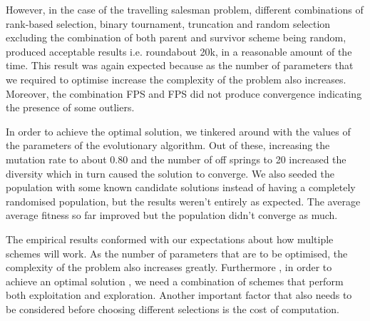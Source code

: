 \documentclass[a4paper]{article}
\begin{document}
However, in the case of the travelling salesman problem, different combinations of rank-based selection, binary tournament, truncation and random selection excluding the combination of both parent and survivor scheme being random, produced acceptable results i.e. roundabout 20k, in a reasonable amount of the time.
This result was again expected because as the number of parameters that we required to optimise increase the complexity of the problem also increases. Moreover, the combination FPS and FPS did not produce convergence indicating the presence of some outliers. \newline

In order to achieve the optimal solution, we tinkered around with the values of the parameters of the evolutionary algorithm. Out of these, increasing the mutation rate to about 0.80 and the number of off springs to 20  increased the diversity which in turn caused the solution to converge.
We also seeded the population with some known candidate solutions instead of having a completely randomised population, but the results weren't entirely as expected. The average average fitness so far improved but the population didn't converge as much. \newline

The empirical results conformed with our expectations about how multiple schemes will work. As the number of parameters that are to be optimised, the complexity of the problem also increases greatly. Furthermore , in order to achieve an optimal solution , we need a combination of schemes that perform both exploitation and exploration. Another important factor that also needs to be considered before choosing different selections is the cost of computation.  
\end{document}
